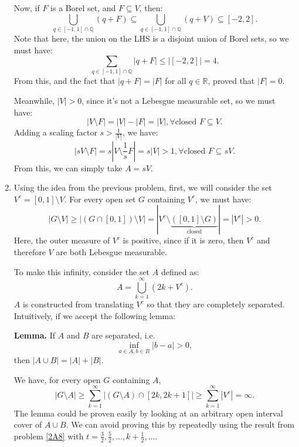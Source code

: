 \begin{enumerate}[label=\textbf{2D.\arabic*}]
      Now, if \( F \) is a Borel set, and \( F \subseteq V \), then:
      \[
        \bigcup_{q \in [-1, 1] \cap \mathbb{Q}} \left( q  + F  \right) \subseteq
        \bigcup_{q \in [-1, 1] \cap \mathbb{Q}} \left( q  + V  \right) \subseteq
        [-2, 2]
      .\] 
      Note that here, the union on the LHS is a disjoint union of Borel sets, so
      we must have:
      \[
        \sum_{q \in [-1, 1] \cap \mathbb{Q}} |q + F| \le |[-2, 2]| = 4
      .\] 
      From this, and the fact that \( |q + F| = |F| \) for all \( q  \in
      \mathbb{R} \), proved that \( |F| = 0 \).

      Meanwhile, \( |V| > 0 \), since it's not a Lebesgue measurable set, so we
      must have:
      \[
        |V \setminus F| = |V|  - |F| = |V|, \forall \text{closed } F \subseteq
        V
      .\]
      Adding a scaling factor \( s > \frac{1}{|V|} \), we have:
      \[
        |sV \setminus F| = s \left| V \setminus \frac{1}{s}F \right|  = s|V| >
        1, \forall \text{closed } F \subseteq sV
      .\] 
      From this, we can simply take \( A = sV \).
\item Using the idea from the previous problem, first, we will consider the set
  \( V^{c} = [0, 1] \setminus V \). For every open set \( G \) containing \(
  V^{c}\), we must have:
  \[
    |G \setminus V| \ge |(G \cap [0, 1]) \setminus V| = |V^{c} \setminus 
    \underbrace{
    ([0, 1] \setminus G)
    }_{\text{closed}}| = |V^{c}| > 0
  .\] 
  Here, the outer measure of \( V^{c} \) is positive, since if it is zero, then
  \( V^{c} \) and therefore \( V \) are both Lebesgue measurable.

  To make this infinity, consider the set \( A \) defined as:
  \[
    A = \bigcup_{k = 1}^{\infty} (2k + V^{c})
  .\] 
  \( A \) is constructed from translating \( V^{c} \) so that they are
  completely separated. Intuitively, if we accept the following lemma:

  \textbf{Lemma.} If \( A \) and \( B \) are separated, i.e.
  \[
    \inf_{a \in A, b \in B} |b - a| > 0
  ,\] 
  then \( |A \cup B| = |A| + |B| \).

  We have, for every open \( G \) containing \( A \),
  \[
    |G \setminus A| \ge  \sum_{k = 1}^{\infty} |(G \setminus A) \cap [2k, 2k +
    1]|
    \ge \sum_{k = 1}^{\infty} |V^{c}| = \infty
  .\] 
The lemma could be proven easily by looking at an arbitrary open interval cover
of \( A \cup B \). We can avoid proving this by repeatedly using the result from
problem \ref{2A8} with \( t = \frac{3}{2}, \frac{5}{2}, \ldots, k + \frac{1}{2},
\ldots \).


\end{enumerate}
